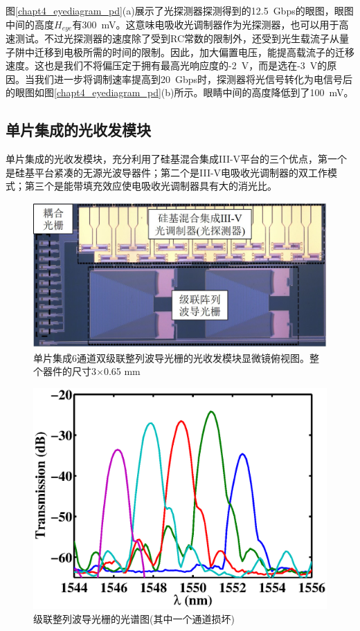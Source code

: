 图\ref{chapt4_eyediagram_pd}(a)展示了光探测器探测得到的12.5~Gbps的眼图，眼图中间的高度$H_{eye}$有300~mV。这意味电吸收光调制器作为光探测器，也可以用于高速测试。不过光探测器的速度除了受到RC常数的限制外，还受到光生载流子从量子阱中迁移到电极所需的时间的限制。因此，加大偏置电压，能提高载流子的迁移速度。这也是我们不将偏压定于拥有最高光响应度的-2~V，而是选在-3~V的原因。当我们进一步将调制速率提高到20~Gbps时，探测器将光信号转化为电信号后的眼图如图\ref{chapt4_eyediagram_pd}(b)所示。眼睛中间的高度降低到了100~mV。

\subsection{单片集成的光收发模块}
单片集成的光收发模块，充分利用了硅基混合集成III-V平台的三个优点，第一个是硅基平台紧凑的无源光波导器件；第二个是III-V电吸收光调制器的双工作模式；第三个是能带填充效应使电吸收光调制器具有大的消光比。
\begin{figure}[htb]
	\centering
	\includegraphics[width=12cm]{./Pictures/chapt4_casacade_awg_structure.jpg}
	\caption{单片集成6通道双级联整列波导光栅的光收发模块显微镜俯视图。整个器件的尺寸3$\times$0.65 mm}
	\label{chapt4_casacade_awg_structure}
\end{figure}
\begin{figure}[htb]
	\centering
	\includegraphics[width=12cm]{./Pictures/chapt4_cascade_awg_spectra.eps}
	\caption{级联整列波导光栅的光谱图(其中一个通道损坏)}
	\label{chapt4_cascade_awg_spectra}
\end{figure}

